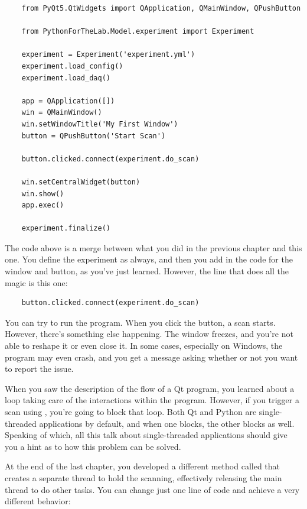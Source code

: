 \begin{verbatim}
    from PyQt5.QtWidgets import QApplication, QMainWindow, QPushButton

    from PythonForTheLab.Model.experiment import Experiment

    experiment = Experiment('experiment.yml')
    experiment.load_config()
    experiment.load_daq()

    app = QApplication([])
    win = QMainWindow()
    win.setWindowTitle('My First Window')
    button = QPushButton('Start Scan')

    button.clicked.connect(experiment.do_scan)

    win.setCentralWidget(button)
    win.show()
    app.exec()

    experiment.finalize()
\end{verbatim}

The code above is a merge between what you did in the previous chapter and this one. You define the experiment as always, and then you add in the code for the window and button, as you've just learned. However, the line that does all the magic is this one:

\begin{verbatim}
    button.clicked.connect(experiment.do_scan)
\end{verbatim}

You can try to run the program. When you click the button, a scan starts. However, there's something else happening. The window freezes, and you're not able to reshape it or even close it. In some cases, especially on Windows, the program may even crash, and you get a message asking whether or not you want to report the issue.


When you saw the description of the flow of a Qt program, you learned about a loop taking care of the interactions within the program. However, if you trigger a scan using , you're going to block that loop. Both Qt and Python are single-threaded applications by default, and when one blocks, the other blocks as well. Speaking of which, all this talk about single-threaded applications should give you a hint as to how this problem can be solved.

At the end of the last chapter, you developed a different method called  that creates a separate thread to hold the scanning, effectively releasing the main thread to do other tasks. You can change just one line of code and achieve a very different behavior:

